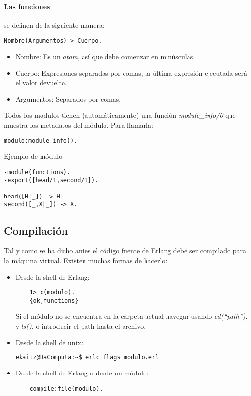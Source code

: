 \paragraph{Las funciones} se definen de la siguiente manera:
\begin{verbatim}
Nombre(Argumentos)-> Cuerpo.
\end{verbatim}

\begin{itemize}
  \item Nombre: Es un \textit{atom}, así que debe comenzar en minúsculas.
  \item Cuerpo: Expresiones separadas por comas, la última expresión ejecutada será el valor devuelto.
  \item Argumentos: Separados por comas.
\end{itemize}

Todos los módulos tienen (automáticamente) una función \textit{module_info/0} que muestra los metadatos del
módulo. Para llamarla:
\begin{lstlisting}
modulo:module_info().
\end{lstlisting}


Ejemplo de módulo:
\begin{lstlisting}
-module(functions).
-export([head/1,second/1]).

head([H|_]) -> H.
second([_,X|_]) -> X.
\end{lstlisting}

\subsection{Compilación}

Tal y como se ha dicho antes el código fuente de Erlang debe ser compilado para la máquina virtual. Existen
muchas formas de hacerlo:
\begin{itemize}
  \item Desde la shell de Erlang:
    \begin{lstlisting}
    1> c(modulo).
    {ok,functions}
    \end{lstlisting}
    Si el módulo no se encuentra en la carpeta actual navegar usando \textit{cd(``path'').} y \textit{ls().} o
    introducir el path hasta el archivo.

  \item Desde la shell de unix:
    \begin{lstlisting}[language=bash]
    ekaitz@DaComputa:~$ erlc flags modulo.erl
    \end{lstlisting}

  \item Desde la shell de Erlang o desde un módulo:
    \begin{lstlisting}
    compile:file(modulo).
    \end{lstlisting}
\end{itemize}




